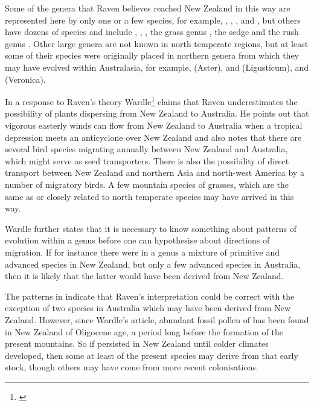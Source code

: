 Some of the genera that Raven believes reached New Zealand in this way are represented here by only one or a few species, for example, , , ,  and , but others have dozens of species and include , , , the grass genus , the sedge  and the rush genus .
Other large genera are not known in north temperate regions, but at least some of their species were originally placed in northern genera from which they may have evolved within Australasia, for example,  (Aster),  and  (Ligusticum), and  (Veronica).

In a response to Raven's theory Wardle\footnote{\cite{wardle1978origin}} claims that Raven underestimates the possibility of plants dispersing from New Zealand to Australia.
He points out that vigorous easterly winds can flow from New Zealand to Australia when a tropical depression meets an anticyclone over New Zealand and also notes that there are several bird species migrating annually between New Zealand and Australia, which might serve as seed transporters.
There is also the possibility of direct transport between New Zealand and northern Asia and north-west America by a number of migratory birds.
A few mountain species of grasses, which are the same as or closely related to north temperate species may have arrived in this way.

Wardle further states that it is necessary to know something about patterns of evolution within a genus before one can hypothesise about directions of migration.
If for instance there were in a genus a mixture of primitive and advanced species in New Zealand, but only a few advanced species in Australia, then it is likely that the latter would have been derived from New Zealand.

The patterns in  indicate that Raven's interpretation could be correct with the exception of two species in Australia which may have been derived from New Zealand.
However, since Wardle's article, abundant fossil pollen of  has been found in New Zealand of Oligocene age, a period long before the formation of the present mountains.
So if  persisted in New Zealand until colder climates developed, then some at least of the present species may derive from that early stock, though others may have come from more recent colonisations.

